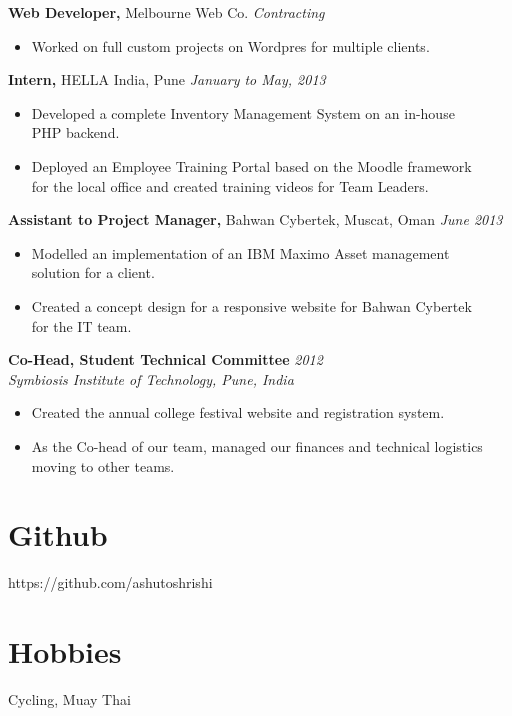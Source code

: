 \documentclass[margin]{res}
\begin{document}
\begin{resume}
  \textbf{Web Developer,} Melbourne Web Co. \hfill \textit{Contracting}
  \begin{itemize} \itemsep -2pt
  \item Worked on full custom projects on Wordpres for multiple clients.
  \end{itemize}

  \textbf{Intern,} HELLA India, Pune \hfill \textit{January to May, 2013}
  \begin{itemize} \itemsep -2pt
  \item Developed a complete Inventory Management System on an in-house \\ 
    PHP backend.
  \item Deployed an Employee Training Portal based on the Moodle framework \\ 
    for the local office and created training videos for Team Leaders. 
  \end{itemize}
  
  \textbf{Assistant to Project Manager,} Bahwan Cybertek, Muscat, Oman
  \hfill \textit{June 2013}
  \begin{itemize} \itemsep -2pt
  \item Modelled an implementation of an IBM Maximo Asset management \\ 
    solution for a client. 
  \item Created a concept design for a responsive website for Bahwan Cybertek \\
    for the IT team. 
  \end{itemize}
  
  \textbf{Co-Head, Student Technical Committee}   \hfill \textit{2012} \\
  \textit{Symbiosis Institute of Technology, Pune, India}
  \begin{itemize} \itemsep -2pt
  \item Created the annual college festival website and registration system.
  \item As the Co-head of our team, managed our finances and technical logistics \\
    moving to other teams.
  \end{itemize}

  \section{Github} 
  https://github.com/ashutoshrishi 
  \section{Hobbies}
  Cycling, Muay Thai

  
  
\end{resume}
\end{document}
